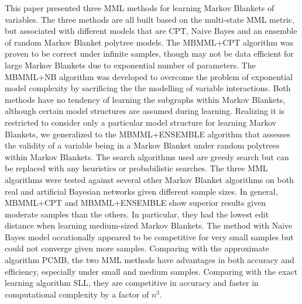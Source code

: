 \documentclass{svmult}
\begin{document}
This paper presented three MML methods for learning Markov Blankets of
variables. The three methods are all built based on the multi-state
MML metric, but associated with different models that are CPT, Naive
Bayes and an ensemble of random Markov Blanket polytree models. The
MBMML+CPT algorithm was proven to be correct under infinite samples,
though may not be data efficient for large Markov Blankets due to
exponential number of parameters. The MBMML+NB algorithm was developed
to overcome the problem of exponential model complexity by sacrificing
the the modelling of variable interactions. Both methods have no
tendency of learning the subgraphs within Markov Blankets, although
certain model structures are assumed during learning. Realizing it is
restricted to consider only a particular model structure for learning
Markov Blankets, we generalized to the MBMML+ENSEMBLE algorithm that
assesses the validity of a variable being in a Markov Blanket under
random polytrees within Markov Blankets. The search algorithms used
are greedy search but can be replaced with any heuristics or
probabilistic searches. The three MML algorithms were tested against
several other Markov Blanket algorithms on both real and artificial
Bayesian networks given different sample sizes. In general, MBMML+CPT
and MBMML+ENSEMBLE show superior results given moderate samples than
the others. In particular, they had the lowest edit distance when
learning medium-sized Markov Blankets. The method with Naive Bayes
model occationally appeared to be competitive for very small samples
but could not converge given more samples. Comparing with the
approximate algorithm PCMB, the two MML methods have advantages in
both accuracy and efficiency, especially under small and medium
samples. Comparing with the exact learning algorithm SLL, they are
competitive in accuracy and faster in computational complexity by a
factor of $n^3$.
\end{document}
